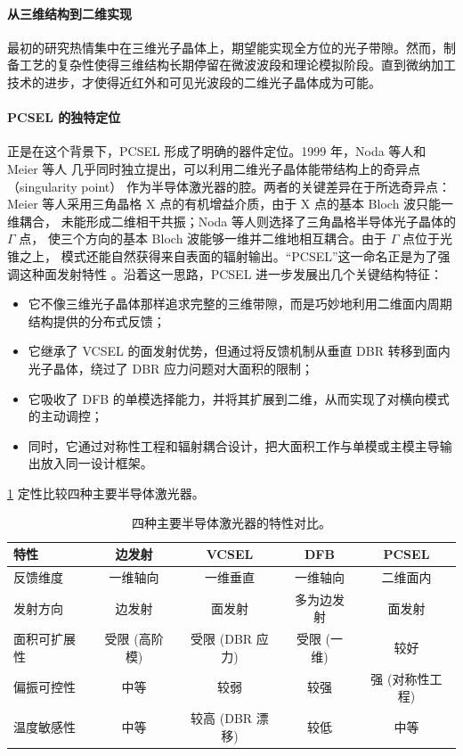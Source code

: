\paragraph{从三维结构到二维实现} 最初的研究热情集中在三维光子晶体上，期望能实现全方位的光子带隙。然而，制备工艺的复杂性使得三维结构长期停留在微波波段和理论模拟阶段。直到微纳加工技术的进步，才使得近红外和可见光波段的二维光子晶体成为可能。

\paragraph{PCSEL 的独特定位}
正是在这个背景下，PCSEL 形成了明确的器件定位。1999 年，Noda 等人和 Meier 等人
几乎同时独立提出，可以利用二维光子晶体能带结构上的奇异点（singularity point）
作为半导体激光器的腔\cite{noda2023tutorial}。两者的关键差异在于所选奇异点：
Meier 等人采用三角晶格 X 点的有机增益介质，由于 X 点的基本 Bloch 波只能一维耦合，
未能形成二维相干共振；Noda 等人则选择了三角晶格半导体光子晶体的 $\Gamma$ 点，
使三个方向的基本 Bloch 波能够一维并二维地相互耦合。由于 $\Gamma$ 点位于光锥之上，
模式还能自然获得来自表面的辐射输出。“PCSEL”这一命名正是为了强调这种面发射特性
\cite{noda2023tutorial}。沿着这一思路，PCSEL 进一步发展出几个关键结构特征：
\begin{itemize}
  \item 它不像三维光子晶体那样追求完整的三维带隙，而是巧妙地利用二维面内周期结构提供的分布式反馈；
  \item 它继承了 VCSEL 的面发射优势，但通过将反馈机制从垂直 DBR 转移到面内光子晶体，绕过了 DBR 应力问题对大面积的限制；
  \item 它吸收了 DFB 的单模选择能力，并将其扩展到二维，从而实现了对横向模式的主动调控；
  \item 同时，它通过对称性工程和辐射耦合设计，把大面积工作与单模或主模主导输出放入同一设计框架。
\end{itemize}

\cref{tab:device-compare-preview} 定性比较四种主要半导体激光器。

\begin{table}[htbp]
  \centering
  \caption{四种主要半导体激光器的特性对比。}
  \label{tab:device-compare-preview}
  \small
  \begin{tabular}{lcccc}
    \toprule
    特性 & 边发射 & VCSEL & DFB & PCSEL \\
    \midrule
    反馈维度 & 一维轴向 & 一维垂直 & 一维轴向 & 二维面内 \\
    发射方向 & 边发射 & 面发射 & 多为边发射 & 面发射 \\
    面积可扩展性 & 受限 (高阶模) & 受限 (DBR 应力) & 受限 (一维) & 较好 \\
    偏振可控性 & 中等 & 较弱 & 较强 & 强 (对称性工程) \\
    温度敏感性 & 中等 & 较高 (DBR 漂移) & 较低 & 中等 \\
    \bottomrule
  \end{tabular}
\end{table}

